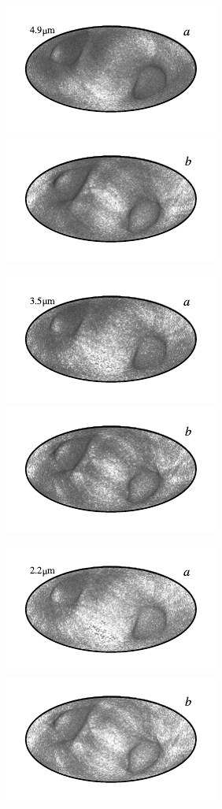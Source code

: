 \documentclass{aa}
\begin{document}
\begin{figure}
	\includegraphics{figs/rms_maps/rms_04a_c0001_000019.pdf}\includegraphics{figs/rms_maps/rms_04b_c0001_000019.pdf}
  \vspace*{-0.85cm}

	\includegraphics{figs/rms_maps/rms_03a_c0001_000019.pdf}\includegraphics{figs/rms_maps/rms_03b_c0001_000019.pdf}
  \vspace*{-0.85cm}

	\includegraphics{figs/rms_maps/rms_02a_c0001_000019.pdf}\includegraphics{figs/rms_maps/rms_02b_c0001_000019.pdf}
  \vspace*{-0.85cm}


\end{figure}
\end{document}
